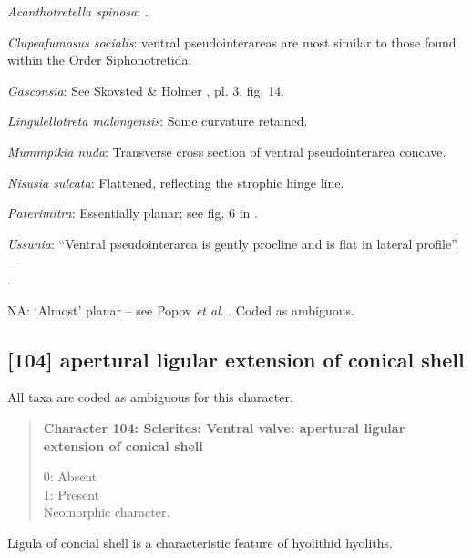 \documentclass[openany]{book}
\theoremstyle{definition}
\theoremstyle{definition}
\theoremstyle{definition}
\theoremstyle{remark}
\begin{document}
\hypertarget{Acanthotretella_spinosa-coding-103}{}
\emph{Acanthotretella spinosa}: \citep{Schwabe2010}.

\hypertarget{Clupeafumosus_socialis-coding-103}{}
\emph{Clupeafumosus socialis}: ventral pseudointerareas are most similar
to those found within the Order Siphonotretida.

\hypertarget{Gasconsia-coding-103}{}
\emph{Gasconsia}: See Skovsted \& Holmer
\citeyearpar{Skovsted2005EarlyCambrian}, pl. 3, fig. 14.

\hypertarget{Lingulellotreta_malongensis-coding-103}{}
\emph{Lingulellotreta malongensis}: Some curvature retained.

\hypertarget{Mummpikia_nuda-coding-103}{}
\emph{Mummpikia nuda}: Transverse cross section of ventral
pseudointerarea concave.

\hypertarget{Nisusia_sulcata-coding-103}{}
\emph{Nisusia sulcata}: Flattened, reflecting the strophic hinge line.

\hypertarget{Paterimitra-coding-103}{}
\emph{Paterimitra}: Essentially planar; see fig. 6 in
\citet{Ushatinskaya2016Protegulumand}.

\hypertarget{Ussunia-coding-103}{}
\emph{Ussunia}: ``Ventral pseudointerarea is gently procline and is flat
in lateral profile''. ---\\
\citep{Topper2013Reappraisalof}.

\hypertarget{NA-coding-103}{}
NA: `Almost' planar -- see Popov \emph{et al}. \citeyearpar[fig.
4]{Popov2009Earlyontogeny}. Coded as ambiguous.

\subsection*{{[}104{]} apertural ligular extension of conical
shell}\label{apertural-ligular-extension-of-conical-shell}

All taxa are coded as ambiguous for this character.

\begin{quote}
\textbf{Character 104: Sclerites: Ventral valve: apertural ligular
extension of conical shell}

0: Absent\\
1: Present\\
Neomorphic character.
\end{quote}

Ligula of concial shell is a characteristic feature of hyolithid
hyoliths.
\end{document}
